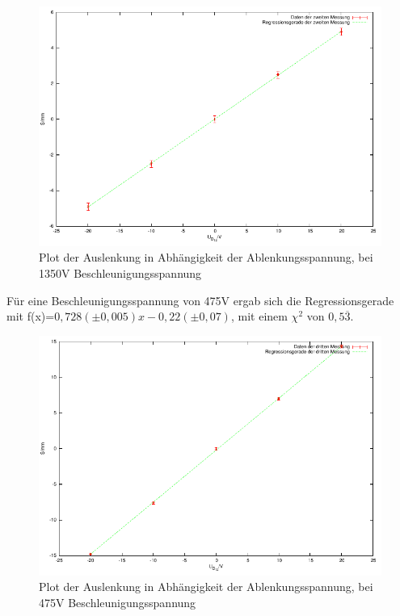 \documentclass[12pt]{scrartcl}
\begin{document}
\begin{figure}[htbp] 
  \centering
    \includegraphics[scale = 1]{x_2.pdf}
  	\caption[Plot der Auslenkung in Abhängigkeit der Ablenkungsspannung, bei 1350V Beschleunigungsspannung]{Plot der Auslenkung in Abhängigkeit der Ablenkungsspannung, bei 1350V Beschleunigungsspannung}
  \label{fig:x_1}
\end{figure}



\newpage

Für eine Beschleunigungsspannung von 475V ergab sich die Regressionsgerade mit f(x)=$0,728 (\pm 0,005) x - 0,22 (\pm 0,07)$, mit einem $\chi^2$ von $0,5\overline{3}$.

\begin{figure}[htbp] 
  \centering
    \includegraphics[scale = 1]{x_3.pdf}
  	\caption[Plot der Auslenkung in Abhängigkeit der Ablenkungsspannung, bei 475V Beschleunigungsspannung]{Plot der Auslenkung in Abhängigkeit der Ablenkungsspannung, bei 475V Beschleunigungsspannung}
  \label{fig:x_1}
\end{figure}
\end{document}
